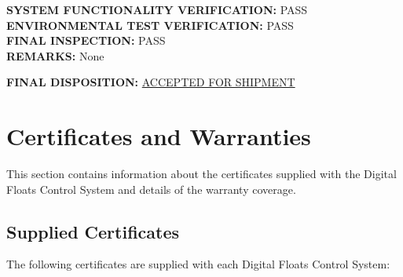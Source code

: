 \documentclass[12pt,a4paper,twoside,openright]{book}
\begin{document}
\begin{center}
{{\textbf{SYSTEM FUNCTIONALITY VERIFICATION:} PASS\\
\textbf{ENVIRONMENTAL TEST VERIFICATION:} PASS\\
\textbf{FINAL INSPECTION:} PASS\\

\textbf{REMARKS:} None\\
\vspace{0.3cm}

\textbf{FINAL DISPOSITION:} \underline{ACCEPTED FOR SHIPMENT}
}}
\end{center}

\section{Certificates and Warranties}

This section contains information about the certificates supplied with the Digital Floats Control System and details of the warranty coverage.

\subsection{Supplied Certificates}

The following certificates are supplied with each Digital Floats Control System:
\end{document}
